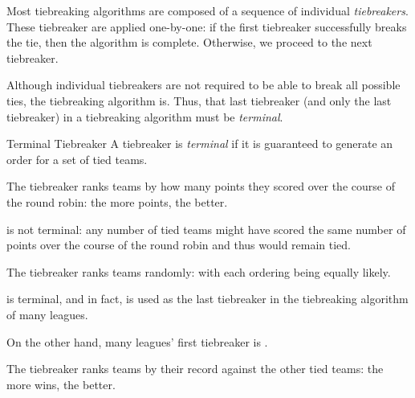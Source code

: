 {Most tiebreaking algorithms are composed of a sequence of individual \textit{tiebreakers}. These tiebreaker are applied one-by-one: if the first tiebreaker successfully breaks the tie, then the algorithm is complete. Otherwise, we proceed to the next tiebreaker.

Although individual tiebreakers are not required to be able to break all possible ties, the tiebreaking algorithm is. Thus, that last tiebreaker (and only the last tiebreaker) in a tiebreaking algorithm must be \textit{terminal}.

\begin{definition}{Terminal Tiebreaker}{}
    A tiebreaker is \textit{terminal} if it is guaranteed to generate an order for a set of tied teams.
\end{definition}

\begin{definition}{}{}
    The  tiebreaker ranks teams by how many points they scored over the course of the round robin: the more points, the better.
\end{definition}

 is not terminal: any number of tied teams might have scored the same number of points over the course of the round robin and thus would remain tied.

\begin{definition}{}{}
    The  tiebreaker ranks teams randomly: with each ordering being equally likely.
\end{definition}

 is terminal, and in fact,  is used as the last tiebreaker in the tiebreaking algorithm of many leagues.

On the other hand, many leagues' first tiebreaker is .

\begin{definition}{}{}
    The  tiebreaker ranks teams by their record against the other tied teams: the more wins, the better.
\end{definition}



}